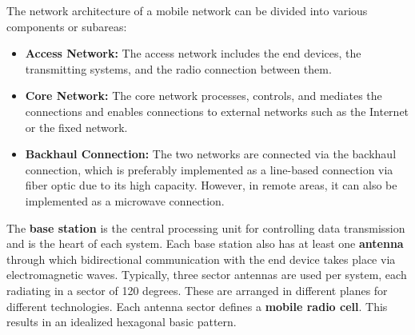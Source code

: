 \begin{English}
    The network architecture of a mobile network can be divided into various components or subareas:

    \begin{itemize}
        \item \textbf{Access Network:} The access network includes the end devices, the transmitting systems, and the radio connection between them.
        \item \textbf{Core Network:} The core network processes, controls, and mediates the connections and enables connections to external networks such as the Internet or the fixed network. \cite{behnkeGrundkursMobilfunkUnd2022}
        \item \textbf{Backhaul Connection:} The two networks are connected via the backhaul connection, which is preferably implemented as a line-based connection via fiber optic due to its high capacity. However, in remote areas, it can also be implemented as a microwave connection.
    \end{itemize}

    The \textbf{base station} is the central processing unit for controlling data transmission and is the heart of each system. Each base station also has at least one \textbf{antenna} through which bidirectional communication with the end device takes place via electromagnetic waves. Typically, three sector antennas are used per system, each radiating in a sector of 120 degrees. These are arranged in different planes for different technologies. Each antenna sector defines a \textbf{mobile radio cell}. This results in an idealized hexagonal basic pattern. \cite{behnkeGrundkursMobilfunkUnd2022}
\end{English}

